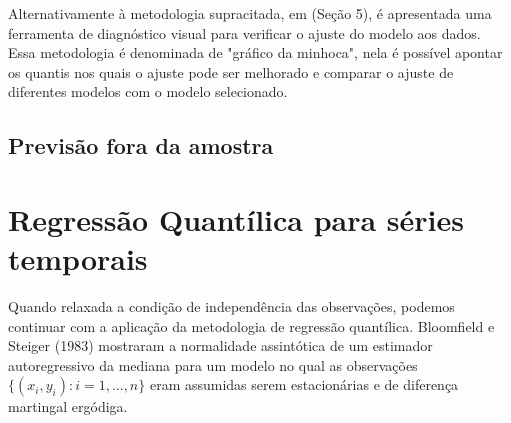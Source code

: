\documentclass[paper=a4, fontsize=11pt]{scrartcl}
\numberwithin{equation}{section}		%
\numberwithin{figure}{section}			%
\numberwithin{table}{section}				%
\begin{document}
Alternativamente à metodologia supracitada, em \cite{van2007worm} (Seção 5), é apresentada uma ferramenta de diagnóstico visual para verificar o ajuste do modelo aos dados. Essa metodologia é denominada de "gráfico da minhoca", nela é possível apontar os quantis nos quais o ajuste pode ser melhorado e comparar o ajuste de diferentes modelos com o modelo selecionado. 


\subsection{Previsão fora da amostra}




\section{Regressão Quantílica para séries temporais}\label{regQuantilicaST}
Quando relaxada a condição de independência das observações, podemos continuar com a aplicação da metodologia de regressão quantílica. Bloomfield e Steiger (1983) mostraram a normalidade assintótica de um estimador autoregressivo da mediana para um modelo no qual as observações $\{(x_{i},y_{i}):i=1,...,n\}$ eram assumidas serem estacionárias e de diferença martingal ergódiga.
\end{document}
